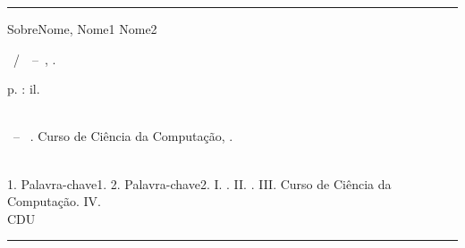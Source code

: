 \begin{fichacatalografica}

	\vspace*{15cm}       %

	\hrule %

	\begin{center}       %

	\begin{minipage}[c]{12.5cm}  %
	
	SobreNome, Nome1 Nome2 %
 
	\hspace{0.5cm}  \imprimirtitulo~/~\imprimirautor~--~\imprimirlocal,  \imprimirdata.
	
	\hspace{0.5cm}  \pageref{LastPage}  p.  :  il.\\

	\hspace{0.5cm}  \imprimirorientadorRotulo ~\imprimirorientador\\

	\hspace{0.5cm}

	\parbox[t]{\textwidth}{\imprimirtipotrabalho ~--~ \imprimirinstituicao. Curso de Ciência da Computação, \imprimirdata.}\\
	
	\hspace{0.5cm}
		1.  Palavra-chave1.
		2.  Palavra-chave2.
		I.  \imprimirorientador.
		II.  \imprimirinstituicao.
		III. Curso de Ciência da Computação.
		IV. \imprimirtitulo\\
	
	\hspace{8.75cm}  CDU  \\ %

	\end{minipage}
	\end{center}
	\hrule
\end{fichacatalografica}
